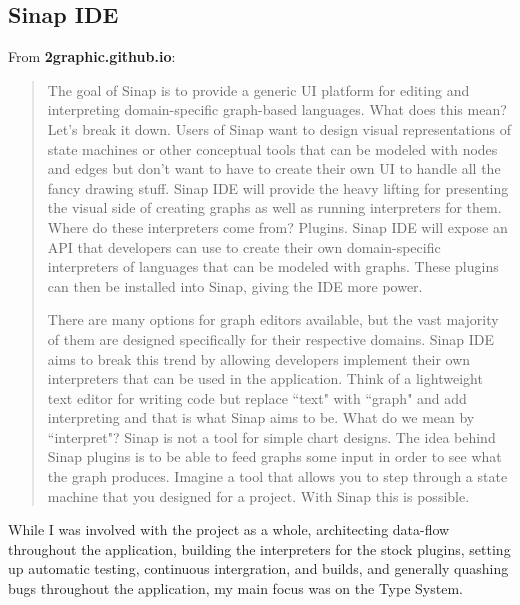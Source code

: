 \documentclass[12pt]{article}
\newcommand{\href}[2]{\textbf{#2}}
\begin{document}
\subsection{Sinap IDE}

From \href{https://2graphic.github.io}{2graphic.github.io}:


\begin{quotation}
    The goal of Sinap is to provide a generic UI platform 
    for editing and interpreting domain-specific graph-based languages. What does 
    this mean? Let's break it down. Users of Sinap want to design visual 
    representations of state machines or other conceptual tools that can be modeled
    with nodes and edges but don't want to have to create their own UI to handle all
    the fancy drawing stuff. Sinap IDE will provide the heavy lifting for presenting
    the visual side of creating graphs as well as running interpreters for them.
    Where do these interpreters come from? Plugins. Sinap IDE will expose an API
    that developers can use to create their own domain-specific interpreters of
    languages that can be modeled with graphs. These plugins can then be installed
    into Sinap, giving the IDE more power.

    There are many options for graph editors available, but the vast majority of them
    are designed specifically for their respective domains. Sinap IDE aims to break 
    this trend by allowing developers implement their own interpreters that can be 
    used in the application. Think of a lightweight text editor for writing code but 
    replace ``text" with ``graph" and add interpreting and that is what Sinap aims to 
    be. What do we mean by ``interpret"? Sinap is not a tool for simple chart designs. 
    The idea behind Sinap plugins is to be able to feed graphs some input in order to 
    see what the graph produces. Imagine a tool that allows you to step through a state 
    machine that you designed for a project. With Sinap this is possible.
\end{quotation}

While I was involved with the project as a whole, architecting 
data-flow throughout the application, building the interpreters
for the stock plugins, setting up automatic testing, continuous 
intergration, and builds, and generally quashing bugs throughout
the application, my main focus was on the Type System. 
\end{document}
